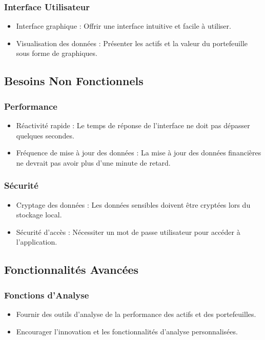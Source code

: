 \documentclass{article}
\begin{document}
\subsubsection{Interface Utilisateur}
\begin{itemize}
    \item Interface graphique : Offrir une interface intuitive et facile à utiliser.
    \item Visualisation des données : Présenter les actifs et la valeur du portefeuille sous forme de graphiques.
\end{itemize}

\subsection{Besoins Non Fonctionnels}
\subsubsection{Performance}
\begin{itemize}
    \item Réactivité rapide : Le temps de réponse de l'interface ne doit pas dépasser quelques secondes.
    \item Fréquence de mise à jour des données : La mise à jour des données financières ne devrait pas avoir plus d'une minute de retard.
\end{itemize}

\subsubsection{Sécurité}
\begin{itemize}
    \item Cryptage des données : Les données sensibles doivent être cryptées lors du stockage local.
    \item Sécurité d'accès : Nécessiter un mot de passe utilisateur pour accéder à l'application.
\end{itemize}

\subsection{Fonctionnalités Avancées}
\subsubsection{Fonctions d'Analyse}
\begin{itemize}
    \item Fournir des outils d'analyse de la performance des actifs et des portefeuilles.
    \item Encourager l'innovation et les fonctionnalités d'analyse personnalisées.
\end{itemize}
\end{document}
